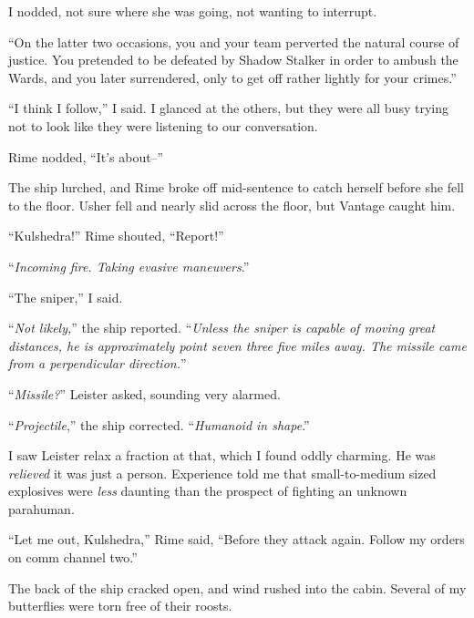 I nodded, not sure where she was going, not wanting to interrupt.



``On the latter two occasions, you and your team perverted the natural course of justice.  You pretended to be defeated by Shadow Stalker in order to ambush the Wards, and you later surrendered, only to get off rather lightly for your crimes.''



``I think I follow,'' I said.  I glanced at the others, but they were all busy trying not to look like they were listening to our conversation.



Rime nodded, ``It's about--''



The ship lurched, and Rime broke off mid-sentence to catch herself before she fell to the floor.  Usher fell and nearly slid across the floor, but Vantage caught him.



``Kulshedra!'' Rime shouted, ``Report!''



``\emph{Incoming fire.  Taking evasive maneuvers}.''



``The sniper,'' I said.



``\emph{Not likely,}'' the ship reported.  ``\emph{Unless the sniper is capable of moving great distances, he is approximately point seven three five miles away.  The missile came from a perpendicular direction.}''



``\emph{Missile?}'' Leister asked, sounding very alarmed.



``\emph{Projectile},'' the ship corrected.  ``\emph{Humanoid in shape}.''



I saw Leister relax a fraction at that, which I found oddly charming.  He was \emph{relieved} it was just a person.  Experience told me that small-to-medium sized explosives were \emph{less} daunting than the prospect of fighting an unknown parahuman.



``Let me out, Kulshedra,'' Rime said, ``Before they attack again.  Follow my orders on comm channel two.''



The back of the ship cracked open, and wind rushed into the cabin.  Several of my butterflies were torn free of their roosts.




